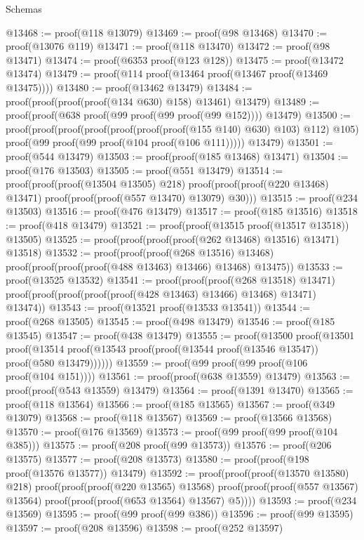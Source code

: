 \begin{lexlean}{Schemas}
\begin{coremodule}
@13468 := proof(@118 @13079)
@13469 := proof(@98 @13468)
@13470 := proof(@13076 @119)
@13471 := proof(@118 @13470)
@13472 := proof(@98 @13471)
@13474 := proof(@6353 proof(@123 @128))
@13475 := proof(@13472 @13474)
@13479 := proof(@114 proof(@13464 proof(@13467 proof(@13469 @13475))))
@13480 := proof(@13462 @13479)
@13484 := proof(proof(proof(proof(@134 @630) @158) @13461) @13479)
@13489 := proof(proof(@638 proof(@99 proof(@99 proof(@99 @152)))) @13479)
@13500 := proof(proof(proof(proof(proof(proof(proof(@155 @140) @630) @103) @112) @105)
        proof(@99 proof(@99 proof(@104 proof(@106 @111)))))
      @13479)
@13501 := proof(@544 @13479)
@13503 := proof(proof(@185 @13468) @13471)
@13504 := proof(@176 @13503)
@13505 := proof(@551 @13479)
@13514 := proof(proof(proof(@13504 @13505) @218)
      proof(proof(proof(@220 @13468) @13471) proof(proof(proof(@557 @13470) @13079) @30)))
@13515 := proof(@234 @13503)
@13516 := proof(@476 @13479)
@13517 := proof(@185 @13516)
@13518 := proof(@418 @13479)
@13521 := proof(proof(@13515 proof(@13517 @13518)) @13505)
@13525 := proof(proof(proof(proof(@262 @13468) @13516) @13471) @13518)
@13532 := proof(proof(proof(@268 @13516) @13468)
      proof(proof(proof(proof(@488 @13463) @13466) @13468) @13475))
@13533 := proof(@13525 @13532)
@13541 := proof(proof(proof(@268 @13518) @13471)
      proof(proof(proof(proof(proof(@428 @13463) @13466) @13468) @13471) @13474))
@13543 := proof(@13521 proof(@13533 @13541))
@13544 := proof(@268 @13505)
@13545 := proof(@498 @13479)
@13546 := proof(@185 @13545)
@13547 := proof(@438 @13479)
@13555 := proof(@13500
      proof(@13501
          proof(@13514 proof(@13543 proof(proof(@13544 proof(@13546 @13547)) proof(@580 @13479))))))
@13559 := proof(@99 proof(@99 proof(@106 proof(@104 @151))))
@13561 := proof(proof(@638 @13559) @13479)
@13563 := proof(proof(@543 @13559) @13479)
@13564 := proof(@1391 @13470)
@13565 := proof(@118 @13564)
@13566 := proof(@185 @13565)
@13567 := proof(@349 @13079)
@13568 := proof(@118 @13567)
@13569 := proof(@13566 @13568)
@13570 := proof(@176 @13569)
@13573 := proof(@99 proof(@99 proof(@104 @385)))
@13575 := proof(@208 proof(@99 @13573))
@13576 := proof(@206 @13575)
@13577 := proof(@208 @13573)
@13580 := proof(proof(@198 proof(@13576 @13577)) @13479)
@13592 := proof(proof(proof(@13570 @13580) @218)
      proof(proof(proof(@220 @13565) @13568)
          proof(proof(proof(@557 @13567) @13564) proof(proof(proof(@653 @13564) @13567) @5))))
@13593 := proof(@234 @13569)
@13595 := proof(@99 proof(@99 @386))
@13596 := proof(@99 @13595)
@13597 := proof(@208 @13596)
@13598 := proof(@252 @13597)

\end{coremodule}
\end{lexlean}
